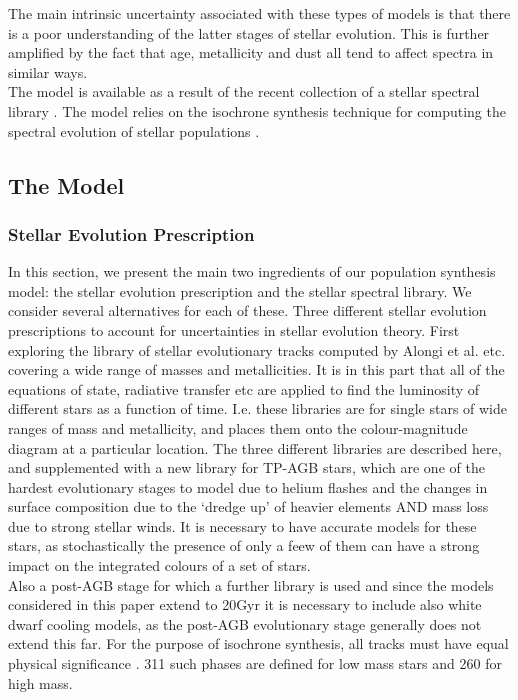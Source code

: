 \documentclass{literature}
\begin{document}
The main intrinsic uncertainty associated with these types of models is that there is a poor understanding of the latter stages of stellar evolution. This is further amplified by the fact that age, metallicity and dust all tend to affect spectra in similar ways. \\ 

The model is available as a result of the recent collection of a stellar spectral library \citep{Borgne_2003}. The model relies on the isochrone synthesis technique for computing the spectral evolution of stellar populations \citep{Bruzual_1991}. 

\subsection{The Model}
\subsubsection{Stellar Evolution Prescription}
In this section, we present the main two ingredients of our population synthesis model: the stellar evolution prescription and the stellar spectral library. We consider several alternatives for each of these. Three different stellar evolution prescriptions to account for uncertainties in stellar evolution theory. First exploring the library of stellar evolutionary tracks computed by Alongi et al. etc. covering a wide range of masses and metallicities. It is in this part that all of the equations of state, radiative transfer etc are applied to find the luminosity of different stars as a function of time. I.e. these libraries are for single stars of wide ranges of mass and metallicity, and places them onto the colour-magnitude diagram at a particular location. The three different libraries are described here, and supplemented with a new library for TP-AGB stars, which are one of the hardest evolutionary stages to model due to helium flashes and the changes in surface composition due to the `dredge up' of heavier elements AND mass loss due to strong stellar winds. It is necessary to have accurate models for these stars, as stochastically the presence of only a feew of them can have a strong impact on the integrated colours of a set of stars. \\ 
Also a post-AGB stage for which a further library is used and since the models considered in this paper extend to 20Gyr it is necessary to include also white dwarf cooling models, as the post-AGB evolutionary stage generally does not extend this far. For the purpose of isochrone synthesis, all tracks must have equal physical significance \citep{Bruzual_1991}. 311 such phases are defined for low mass stars and 260 for high mass. \\
\end{document}
